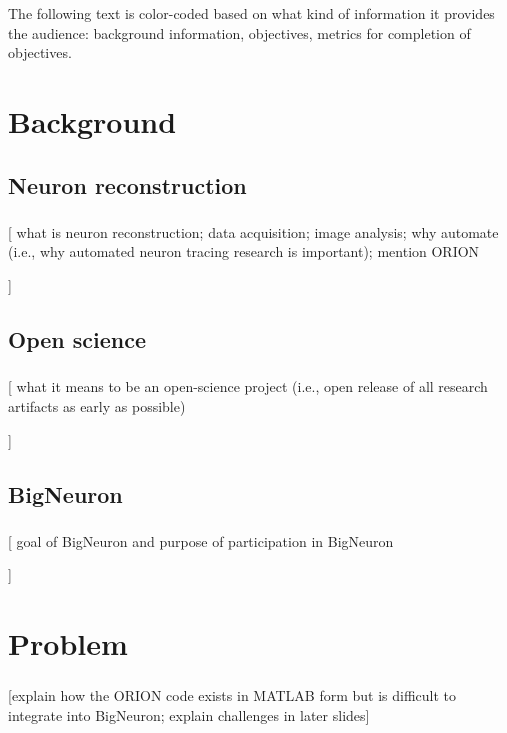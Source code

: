 \documentclass{beamer}
\newcommand{\tbackground}[1]{#1}
\newcommand{\tobjectives}[1]{#1}
\newcommand{\tmetrics}[1]{#1}
\newcommand{\tbackground}[1]{\textcolor{tbackground}{#1}}
\newcommand{\tobjectives}[1]{\textcolor{tobjectives}{#1}}
\newcommand{\tmetrics}[1]{\textcolor{tmetrics}{#1}}
\begin{document}

\frame{\titlepage}

\ifx \tcolor \undefined
\else
	The following text is color-coded based on what kind of
	information it provides the audience:
	\tbackground{background information},
	\tobjectives{objectives},
	\tmetrics{metrics for completion of objectives}.
\fi

\ifx \printpresentarticle \undefined \else
	\tableofcontents
\fi

\section{Background}
\subsection{Neuron reconstruction}
\begin{frame}\frametitle{\subsecname}
	[\tbackground
		{
			what is neuron reconstruction; data acquisition; image analysis; why
			automate (i.e., why automated neuron
			tracing research is important);
			mention ORION
		}
	]
\end{frame}

\subsection{Open science}
\begin{frame}\frametitle{\subsecname}
	[\tbackground
		{
		what it means to be an open-science project (i.e., open release of all
		research artifacts as early as possible)
		}
	]
\end{frame}

\subsection{BigNeuron}
\begin{frame}\frametitle{\subsecname}
	[\tbackground
		{
			goal of BigNeuron and purpose of participation in
			BigNeuron
		}
	]
\end{frame}

\section{Problem}
\begin{frame}\frametitle{\secname}
	[\tbackground{explain how the ORION code exists in MATLAB form but is difficult to
	integrate into BigNeuron}; explain challenges in later slides]
\end{frame}
\end{document}

